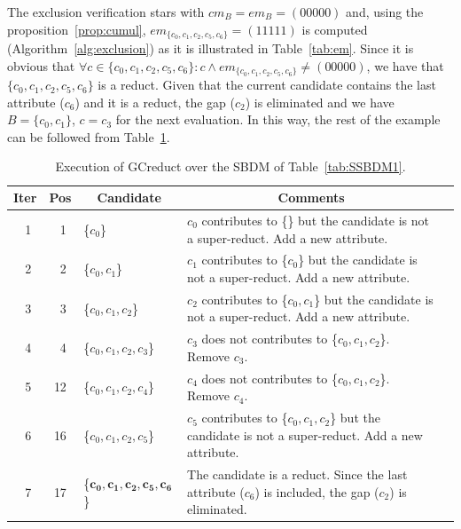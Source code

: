 \documentclass[number,preprint,review,12pt]{elsarticle}
\begin{document}
  The exclusion verification stars with $cm_B = em_B = (00000)$ and, using the proposition~\ref{prop:cumul}, $em_{\lbrace c_0,c_1,c_2,c_5,c_6\rbrace}=(11111)$ is computed (Algorithm~\ref{alg:exclusion}) as it is illustrated in Table~\ref{tab:em}. Since it is obvious that $\forall c \in \lbrace c_0,c_1,c_2,c_5,c_6\rbrace : c\wedge em_{\lbrace c_0,c_1,c_2,c_5,c_6\rbrace} \neq (00000)$, we have that $\lbrace c_0,c_1,c_2,c_5,c_6\rbrace$ is a reduct. Given that the current candidate contains the last attribute ($c_6$) and it is a reduct, the gap ($c_2$) is eliminated and we have $B = \lbrace c_0,c_1\rbrace$, $c=c_3$ for the next evaluation. In this way, the rest of the example can be followed from Table~\ref{tab:sample_GCreduct}.

  \begin{table}[!htb]
	\caption{Execution of GCreduct over the SBDM of Table~\ref{tab:SSBDM1}.}\label{tab:sample_GCreduct}
	\centering \scriptsize
	\begin{tabular}{|c|c|l|l|l|}
		\hline
		Iter & Pos & \multicolumn{1}{c|}{Candidate} & \multicolumn{1}{c|}{Comments}\\
		\hline
		~1 & ~1 & \{$c_0$\} 			    & \multicolumn{1}{p{8.5cm}|}{$c_0$ contributes to \{\} but the candidate is not a super-reduct. Add a new attribute.}\\
				\hline
		~2 & ~2 & \{$c_0,c_1$\}				& \multicolumn{1}{p{8.5cm}|}{$c_1$ contributes to \{$c_0$\} but the candidate is not a super-reduct. Add a new attribute.}\\
				\hline
		~3 & ~3 & \{$c_0,c_1,c_2$\}			& \multicolumn{1}{p{8.5cm}|}{$c_2$ contributes to \{$c_0,c_1$\} but the candidate is not a super-reduct. Add a new attribute.}\\
				\hline				
		~4 & ~4 & \{$c_0,c_1,c_2,c_3$\}		& \multicolumn{1}{p{8.5cm}|}{$c_3$ does not contributes to \{$c_0,c_1,c_2$\}. Remove $c_3$.}\\
				\hline
		~5 & 12 & \{$c_0,c_1,c_2,c_4$\}		& \multicolumn{1}{p{8.5cm}|}{$c_4$ does not contributes to \{$c_0,c_1,c_2$\}. Remove $c_4$.}\\
				\hline
		~6 & 16 & \{$c_0,c_1,c_2,c_5$\}		& \multicolumn{1}{p{8.5cm}|}{$c_5$ contributes to \{$c_0,c_1,c_2$\} but the candidate is not a super-reduct. Add a new attribute.}\\
				\hline
		~7 & 17 & \{$\mathbf{c_0,c_1,c_2,c_5,c_6}$\} & \multicolumn{1}{p{8.5cm}|}{The candidate is a reduct. Since the last attribute ($c_6$) is included, the gap ($c_2$) is eliminated.}\\
				\hline

\end{tabular}
\end{table}
\end{document}
